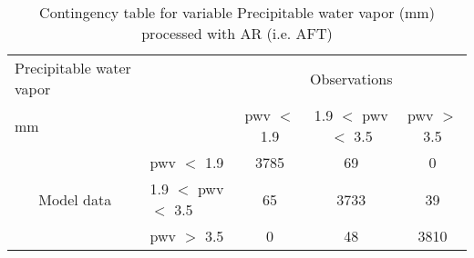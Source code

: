 \begin{table}[]
\begin{center}
\begin{tabular}{llccc}
\hline
{Precipitable water vapor}                                       &                                                    & \multicolumn{3}{c}{Observations}                 \\
{mm}                                       &                             & pwv $<$ 1.9   & 1.9 $<$ pwv $<$ 3.5 & pwv $>$ 3.5 \\
\hline
\multicolumn{1}{c}{\multirow{3}{*}{Model data}}  & pwv $<$ 1.9             & 3785                & 69                       & 0              \\
                                                 & 1.9  $<$ pwv $<$ 3.5 & 65                & 3733                       & 39              \\
                                                 & pwv $>$ 3.5             & 0                & 48                       & 3810              \\
\hline
\end{tabular}
\end{center}
\caption{Contingency table for variable Precipitable water vapor (mm) processed with AR (i.e. AFT)}
\label{tab:contingencypwvAFT}
\end{table}
